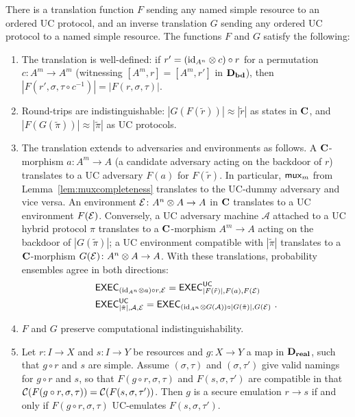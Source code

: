 \begin{theorem}[Translation]\label{thm:translation}
There is a translation function $F$ sending any named simple resource  to an ordered UC protocol, and an inverse translation $G$ sending any ordered UC protocol to a named simple resource. The functions $F$ and $G$ satisfy the following:

\begin{enumerate}

\item The translation is well-defined: if $r' = (\id[A^n] \otimes c) \circ r$  for a permutation $c \colon A^m \to A^m$ (witnessing $[A^m,r] = [A^m,r']$  in $\DB$), then $\left\vert F(r', \sigma,\tau\circ c^{-1})\right\vert=\left\vert F(r, \sigma,\tau)\right\vert$.

\item  Round-trips are indistinguishable: $\left\vert G(F(\tilde{r}))\right\vert \approx \left\vert\tilde{r}\right\vert$ as states in  $\CC$, and $\left\vert F(G(\tilde{\pi}))\right\vert\approx \left\vert\tilde{\pi}\right\vert$ as UC protocols.

\item The translation extends to adversaries and environments as follows. A $\CC$-morphism  $a \colon A^m \to A$ (a candidate adversary acting on the backdoor of $r$) translates to a UC adversary $F(a)$ for $F(\tilde{r})$. In particular, $\mux_m$ from Lemma~\ref{lem:muxcompleteness} translates to the UC-dummy adversary and vice versa.  An environment 
$\E \colon A^n \otimes A \to A$ in $\CC$ translates to a UC environment $F(\E)$. Conversely, a UC adversary machine $\mathcal{A}$ attached to a UC hybrid protocol $\pi$ 
translates to a $\CC$-morphism $A^m \to A$ acting on the backdoor of $\left\vert G(\tilde{\pi})\right\vert$; a UC environment compatible with $\left\vert\tilde{\pi}\right\vert$
translates to a $\CC$-morphism $G(\E) \colon A^n \otimes A \to A$. With these translations, probability 
ensembles agree in both directions:
\begin{align*}
    &\exec_{(\id[A^n] \otimes a) \circ r, \E} = \ucexec_{\left\vert F(\tilde{r})\right\vert, F(a), F(\E)} \\
    &\ucexec_{\left\vert\tilde{\pi}\right\vert, \mathcal{A}, \E} = \exec_{(\id[A^n] \otimes G(\mathcal{A})) \circ \left\vert G(\tilde{\pi})\right\vert, G(\E)}~.
\end{align*}
\item $F$ and $G$ preserve computational indistinguishability.

\item Let $r\colon I\to X$ and $s\colon I\to Y$ be resources and $g\colon X\to Y$ a map in $\DR$, such that  $g\circ r$ and $s$ are simple. Assume $(\sigma,\tau)$ and $(\sigma,\tau')$ give valid namings for $g\circ r$ and $s$, so that $F(g \circ  r,\sigma,\tau)$ and $F(s,\sigma,\tau')$ are compatible in that $\conn(F(g \circ  r,\sigma,\tau))=\conn (F(s,\sigma,\tau'))$. Then $g$ is a secure emulation $r \to s$ if and only if  $F(g \circ  r,\sigma,\tau)$ UC-emulates $F(s,\sigma,\tau')$.
\end{enumerate}
\end{theorem}


